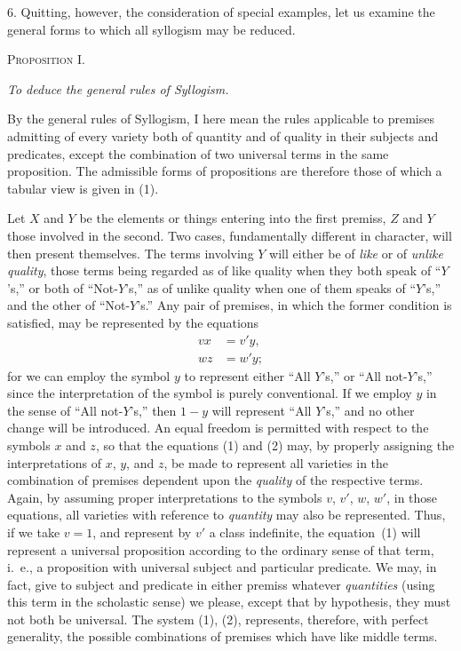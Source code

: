 \documentclass[oneside]{book}
\begin{document}
6. Quitting, however, the consideration of special examples,
let us examine the general forms to which all syllogism may be
reduced.

\begin{center}
\textsc{Proposition I.}

\emph{To deduce the general rules of Syllogism.}
\end{center}

By the general rules of Syllogism, I here mean the rules applicable
to premises admitting of every variety both of quantity
and of quality in their subjects and predicates, except the combination
of two universal terms in the same proposition. The
admissible forms of propositions are therefore those of which a
tabular view is given in (1).

Let $X$ and $Y$ be the elements or things entering into the first
premiss, $Z$ and $Y$ those involved in the second. Two cases, fundamentally
different in character, will then present themselves.
The terms involving $Y$ will either be of \textit{like} or of \textit{unlike quality},
those terms being regarded as of like quality when they both
speak of ``$Y$'s,'' or both of ``Not-$Y$'s,'' as of unlike quality when
one of them speaks of ``$Y$'s,'' and the other of ``Not-$Y$'s.'' Any
pair of premises, in which the former condition is satisfied, may
be represented by the equations
\begin{align*}
 \tag{1}
vx &= v'y,\\
 \tag{2}
wz &= w'y;
\end{align*}
for we can employ the symbol $y$ to represent either ``All $Y$'s,''
or ``All not-$Y$'s,'' since the interpretation of the symbol is purely
conventional. If we employ $y$ in the sense of ``All not-$Y$'s,''
then $1-y$ will represent ``All $Y$'s,'' and no other change will
be introduced. An equal freedom is permitted with respect
to the symbols $x$ and $z$, so that the equations (1) and (2) may,
by properly assigning the interpretations of $x$, $y$, and $z$, be made
to represent all varieties in the combination of premises dependent
upon the \textit{quality} of the respective terms. Again, by assuming
proper interpretations to the symbols $v$, $v'$, $w$, $w'$, in those
equations, all varieties with reference to \textit{quantity} may also be
represented. Thus, if we take $v=1$, and represent by $v'$ a class
indefinite, the equation~(1) will represent a universal proposition
according to the ordinary sense of that term, i.~e., a proposition
with universal subject and particular predicate. We may, in
fact, give to subject and predicate in either premiss whatever
\textit{quantities} (using this term in the scholastic sense) we please, except
that by hypothesis, they must not both be universal. The
system (1), (2), represents, therefore, with perfect generality,
the possible combinations of premises which have like middle
terms.
\end{document}

